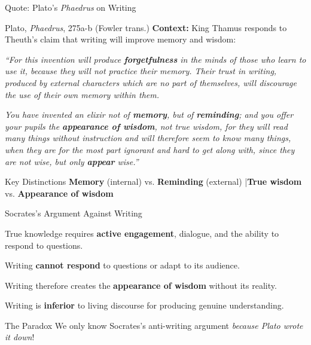 \documentclass[aspectratio=169]{beamer}
\begin{document}
\begin{frame}{Quote: Plato's \textit{Phaedrus} on Writing}
\begin{exampleblock}{\faQuoteLeft\hspace{0.5em}Plato, \textit{Phaedrus}, 275a-b (Fowler trans.)}
\small
\textbf{Context:} King Thamus responds to Theuth's claim that writing will improve memory and wisdom:

\vspace{0.5em}
\textit{``For this invention will produce \textbf{forgetfulness} in the minds of those who learn to use it, because they will not practice their memory. Their trust in writing, produced by external characters which are no part of themselves, will discourage the use of their own memory within them.}

\vspace{0.3em}
\textit{You have invented an elixir not of \textbf{memory}, but of \textbf{reminding}; and you offer your pupils the \textbf{appearance of wisdom}, not true wisdom, for they will read many things without instruction and will therefore seem to know many things, when they are for the most part ignorant and hard to get along with, since they are not wise, but only \textbf{appear} wise.''}
\end{exampleblock}

\vspace{0.3em}
\begin{block}{\faLightbulb\hspace{0.5em}Key Distinctions}
\textbf{Memory} (internal) vs. \textbf{Reminding} (external) \quad|\quad \textbf{True wisdom} vs. \textbf{Appearance of wisdom}
\end{block}
\end{frame}

\begin{frame}{Socrates's Argument Against Writing}
\begin{argument}
  \item True knowledge requires \textbf{active engagement}, dialogue, and the ability to respond to questions.
  \item Writing \textbf{cannot respond} to questions or adapt to its audience.
  \item Writing therefore creates the \textbf{appearance of wisdom} without its reality.
  \item[\textbf{$\therefore$}] Writing is \textbf{inferior} to living discourse for producing genuine understanding.
\end{argument}

\vspace{0.5em}

\vspace{0.3em}
\begin{alertblock}{The Paradox}
We only know Socrates's anti-writing argument \textit{because Plato wrote it down}!
\end{alertblock}
\end{frame}
\end{document}

